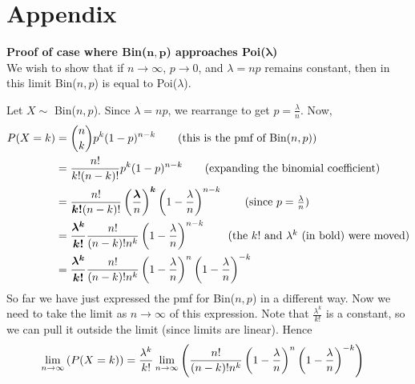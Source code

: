 \section{Appendix} \label{appendixE}
\textbf{Proof of case where Bin($\boldsymbol{n,p}$) approaches Poi($\boldsymbol{\lambda}$)}\bigskip \\

\noindent We wish to show that if $n \rightarrow \infty$, $p \rightarrow 0$, and $\lambda = np$ remains constant, then in this limit Bin($n,p$) is equal to Poi($\lambda$).

\noindent Let $X \sim $ Bin($n,p$). Since $\lambda = np$, we rearrange to get $p = \frac{\lambda}{n}$. Now,
\begin{align*}
P(X = k) & = \binom{n}{k}p^k(1-p)^{n-k} \tag{this is the pmf of Bin($n,p$)} \\
	& = \frac{n!}{k!(n-k)!}p^k(1-p)^{n-k} \tag{expanding the binomial coefficient} \\
	& = \frac{n!}{\boldsymbol{k!}(n-k)!}\brac{\frac{\boldsymbol{\lambda}}{n}}^{\boldsymbol{k}} \brac{1-\frac{\lambda}{n}}^{n-k} \tag{since $p = \frac{\lambda}{n}$} \\
	& = \boldsymbol{\frac{\lambda^k}{k!}} \frac{n!}{(n-k)!n^k} \brac{1-\frac{\lambda}{n}}^{n-k} \tag{the $k!$ and $\lambda^k$ (in bold) were moved} \\
	& =  \boldsymbol{\frac{\lambda^k}{k!}} \frac{n!}{(n-k)!n^k}\brac{1-\frac{\lambda}{n}}^{n}\brac{1-\frac{\lambda}{n}}^{-k}
\end{align*}
So far we have just expressed the pmf for Bin($n,p$) in a different way. Now we need to take the limit as $n \rightarrow \infty$ of this expression. Note that $\frac{\lambda^k}{k!}$ is a constant, so we can pull it outside the limit (since limits are linear). Hence
\begin{align*}
\lim_{n \rightarrow \infty}\left(P(X = k)\right) & = \frac{\lambda^k}{k!}\lim_{n \rightarrow \infty}\left(\frac{n!}{(n-k)!n^k}\left(1-\frac{\lambda}{n}\right)^{n}\left(1-\frac{\lambda}{n}\right)^{-k}\right)
\end{align*}

